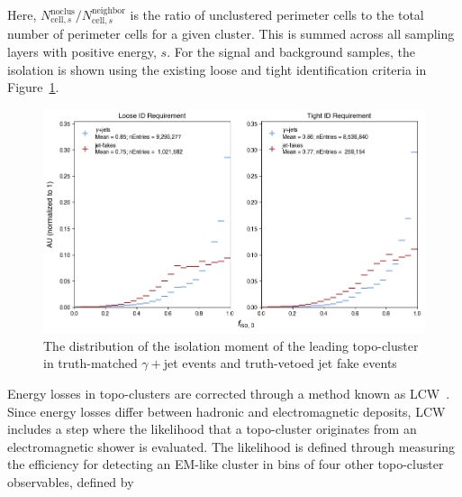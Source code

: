 Here, $N_{\text{cell},s}^{\text{noclus}} / N_{\text{cell},s}^{\text{neighbor}}$ is the ratio of unclustered perimeter cells to the total number of perimeter cells for a given cluster. This is summed across all sampling layers with positive energy, $s$. For the signal and background samples, the isolation is shown using the existing loose and tight identification criteria in Figure~\ref{fig:topo-isolation}.

\begin{figure}[htb]
    \centering 
    \includegraphics[width=\textwidth]{chapters/chapter4_photonID/images/hists/y_topoCluster0_isolation.png}
    \caption[The distribution of the isolation moment of the leading topo-cluster]{The distribution of the isolation moment of the leading topo-cluster in truth-matched $\gamma+$jet events and truth-vetoed jet fake events}
    \label{fig:topo-isolation}
\end{figure}

Energy losses in topo-clusters are corrected through a method known as \gls{LCW}~\cite{lcw-calib}. Since energy losses differ between hadronic and electromagnetic deposits, \gls{LCW} includes a step where the likelihood that a topo-cluster originates from an electromagnetic shower is evaluated. The likelihood is defined through measuring the efficiency for detecting an EM-like cluster in bins of four other topo-cluster observables, defined by

